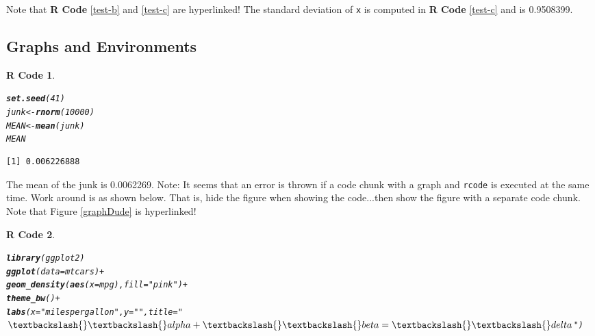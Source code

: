\documentclass{article}\usepackage[]{graphicx}\usepackage[]{color}
\makeatletter
\newcommand{\hlnum}[1]{\textcolor[rgb]{0.686,0.059,0.569}{#1}}%
\newcommand{\hlstr}[1]{\textcolor[rgb]{0.192,0.494,0.8}{#1}}%
\newcommand{\hlopt}[1]{\textcolor[rgb]{0,0,0}{#1}}%
\newcommand{\hlstd}[1]{\textcolor[rgb]{0.345,0.345,0.345}{#1}}%
\newcommand{\hlkwb}[1]{\textcolor[rgb]{0.69,0.353,0.396}{#1}}%
\newcommand{\hlkwc}[1]{\textcolor[rgb]{0.333,0.667,0.333}{#1}}%
\newcommand{\hlkwd}[1]{\textcolor[rgb]{0.737,0.353,0.396}{\textbf{#1}}}%
\newenvironment{kframe}{%
 \def\at@end@of@kframe{}%
 \ifinner\ifhmode%
  \def\at@end@of@kframe{\end{minipage}}%
  \begin{minipage}{\columnwidth}%
 \fi\fi%
 \def\FrameCommand##1{\hskip\@totalleftmargin \hskip-\fboxsep
 \colorbox{shadecolor}{##1}\hskip-\fboxsep
     \hskip-\linewidth \hskip-\@totalleftmargin \hskip\columnwidth}%
 \MakeFramed {\advance\hsize-\width
   \@totalleftmargin\z@ \linewidth\hsize
   \@setminipage}}%
 {\par\unskip\endMakeFramed%
 \at@end@of@kframe}
\newenvironment{knitrout}{}{} %
\theoremstyle{rcode}
\newtheorem{rcode}{R Code}[section]
\makeatother
\begin{document}
Note that \textbf{R Code} \vref{test-b} and \vref{test-c} are hyperlinked!  The standard deviation of \texttt{x} is computed in \textbf{R Code} \vref{test-c} and is 0.9508399.

\clearpage
\subsection{Graphs and Environments}

\begin{knitrout}
\color{fgcolor}\begin{kframe}
\begin{rcode}\label{plot1}\hfill{}\begin{alltt}
\hlkwd{set.seed}\hlstd{(}\hlnum{41}\hlstd{)}
\hlstd{junk} \hlkwb{<-} \hlkwd{rnorm}\hlstd{(}\hlnum{10000}\hlstd{)}
\hlstd{MEAN} \hlkwb{<-} \hlkwd{mean}\hlstd{(junk)}
\hlstd{MEAN}
\end{alltt}
\begin{verbatim}
[1] 0.006226888
\end{verbatim}
\end{rcode}\end{kframe}
\end{knitrout}

The mean of the junk is 0.0062269.  Note: It seems that an error is thrown if
a code chunk with a graph and \texttt{rcode} is executed at the same time.  Work around is
as shown below.  That is, hide the figure when showing the code...then show the figure
with a separate code chunk.  Note that Figure \vref{graphDude} is hyperlinked!

\begin{knitrout}
\color{fgcolor}\begin{kframe}
\begin{rcode}\label{Graph}\hfill{}\begin{alltt}
\hlkwd{library}\hlstd{(ggplot2)}
\hlkwd{ggplot}\hlstd{(}\hlkwc{data} \hlstd{= mtcars)} \hlopt{+}
  \hlkwd{geom_density}\hlstd{(}\hlkwd{aes}\hlstd{(}\hlkwc{x} \hlstd{= mpg),} \hlkwc{fill} \hlstd{=} \hlstr{"pink"}\hlstd{)} \hlopt{+}
  \hlkwd{theme_bw}\hlstd{()} \hlopt{+}
  \hlkwd{labs}\hlstd{(}\hlkwc{x} \hlstd{=} \hlstr{"miles per gallon"}\hlstd{,} \hlkwc{y} \hlstd{=} \hlstr{""}\hlstd{,} \hlkwc{title} \hlstd{=} \hlstr{"$\textbackslash{}\textbackslash{}alpha + \textbackslash{}\textbackslash{}beta = \textbackslash{}\textbackslash{}delta$"}\hlstd{)}
\end{alltt}
\end{rcode}\end{kframe}
\end{knitrout}
\end{document}
